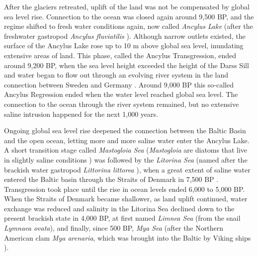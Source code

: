 After the glaciers retreated, uplift of the land was not be compensated by 
global sea level rise. Connection to the ocean was closed again around 9,500 BP, 
and the regime shifted to fresh water conditions again, now called 
\textit{Ancylus Lake} (after the freshwater gastropod \textit{Ancylus 
fluviatilis} \citep[][]{tikkanen2002}). Although narrow outlets existed, the 
surface of the Ancylus Lake rose up to 10 m above global sea level, inundating 
extensive areas of land. This phase, called the Ancylus Transgression, ended 
around 9,200 BP, when the sea level height exceeded the height of the Darss Sill 
and water began to flow out through an evolving river system in the land 
connection between Sweden and Germany \citep[][]{tikkanen2002}. Around 9,000 BP 
this so-called Ancylus Regression ended when the water level reached global sea 
level. The connection to the ocean through the river system remained, but no 
extensive saline intrusion happened for the next 1,000 years.

Ongoing global sea level rise deepened the connection between the Baltic Basin 
and the open ocean, letting more and more saline water enter the Ancylus Lake. A 
short transition stage called \textit{Mastogloia Sea} (\textit{Mastogloia} are 
diatoms that live in slightly saline conditions \citep[][]{eronen2001}) was 
followed by the \textit{Litorina Sea} (named after the brackish water gastropod 
\textit{Littorina littorea} \citep[][]{eronen2001}), when a great extent of 
saline water entered the Baltic basin through the Straits of Denmark in 7,500 BP 
\citep[][]{bjoerk95}. Transgression took place until the rise in ocean levels 
ended 6,000 to 5,000 BP. When the Straits of Denmark became shallower, as land 
uplift continued, water exchange was reduced and salinity in the Litorina Sea 
declined down to the present brackish state in 4,000 BP, at first named 
\textit{Limnea Sea} (from the snail \textit{Lymnaea ovata}), and finally, since 
500 BP, \textit{Mya Sea} (after the Northern American clam \textit{Mya 
arenaria}, which was brought into the Baltic by Viking ships 
\citep[][]{bjoerck2008}).

